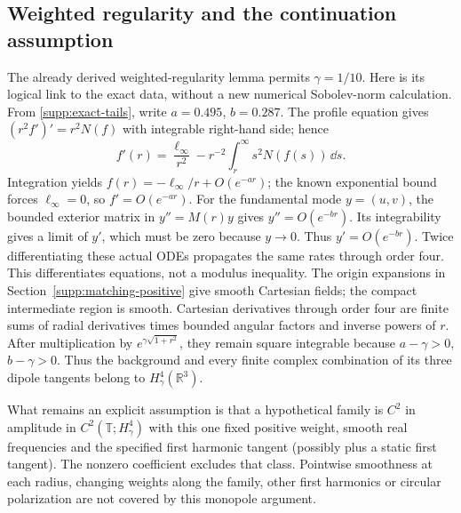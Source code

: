 \subsection{Weighted regularity and the continuation assumption}
The already derived weighted-regularity lemma permits $\gamma=1/10$.
Here is its logical link to the exact data, without a new numerical
Sobolev-norm calculation. From \eqref{supp:exact-tails}, write
$a=0.495$, $b=0.287$. The profile equation gives
$(r^2f')'=r^2N(f)$ with integrable right-hand side; hence
\begin{equation}
 f'(r)=\frac{\ell_\infty}{r^2}
       -r^{-2}\int_r^\infty s^2N(f(s))\,\dd s.
\end{equation}
Integration yields $f(r)=-\ell_\infty/r+O(e^{-ar})$; the known
exponential bound forces $\ell_\infty=0$, so $f'=O(e^{-ar})$.
For the fundamental mode $y=(u,v)$, the bounded exterior matrix in
$y''=M(r)y$ gives $y''=O(e^{-br})$. Its integrability gives a limit
of $y'$, which must be zero because $y\to0$. Thus $y'=O(e^{-br})$.
Twice differentiating these actual ODEs propagates the same rates through
order four. This differentiates equations, not a modulus inequality.
The origin expansions in Section~\ref{supp:matching-positive} give
smooth Cartesian fields; the compact intermediate region is smooth.
Cartesian derivatives through order four are finite sums of radial
derivatives times bounded angular factors and inverse powers of $r$.
After multiplication by $e^{\gamma\sqrt{1+r^2}}$, they remain square
integrable because $a-\gamma>0$, $b-\gamma>0$. Thus the background
and every finite complex combination of its three dipole tangents
belong to $H^4_\gamma(\mathbb R^3)$.

What remains an explicit assumption is that a hypothetical family is
$C^2$ in amplitude in $C^2(\mathbb T;H^4_\gamma)$ with this one fixed
positive weight, smooth real frequencies and the specified first
harmonic tangent (possibly plus a static first tangent).
The nonzero coefficient excludes that class. Pointwise smoothness at
each radius, changing weights along the family, other first harmonics
or circular polarization are not covered by this monopole argument.
